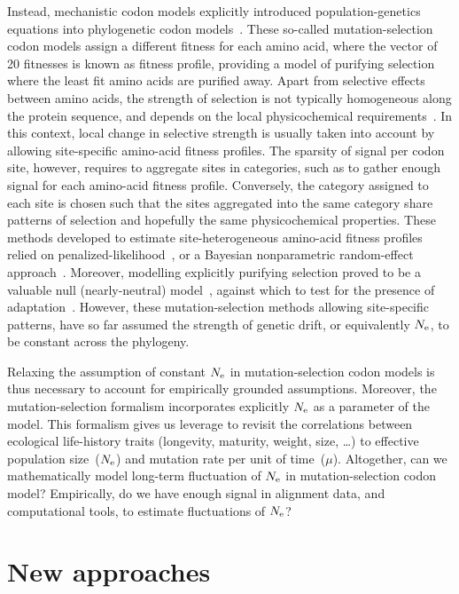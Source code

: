 Instead, mechanistic codon models explicitly introduced population-genetics equations into phylogenetic codon models~\citep{Halpern1998}.
These so-called mutation-selection codon models assign a different fitness for each amino acid, where the vector of 20 fitnesses is known as fitness profile, providing a model of purifying selection where the least fit amino acids are purified away.
Apart from selective effects between amino acids, the strength of selection is not typically homogeneous along the protein sequence, and depends on the local physicochemical requirements~\citep{Echave2016, Goldstein2016,Goldstein2017}.
In this context, local change in selective strength is usually taken into account by allowing site-specific amino-acid fitness profiles.
The sparsity of signal per codon site, however, requires to aggregate sites in categories, such as to gather enough signal for each amino-acid fitness profile.
Conversely, the category assigned to each site is chosen such that the sites aggregated into the same category share patterns of selection and hopefully the same physicochemical properties.
These methods developed to estimate site-heterogeneous amino-acid fitness profiles relied on penalized-likelihood~\citep{Tamuri2012,Tamuri2014}, or a Bayesian nonparametric random-effect approach~\citep{Rodrigue2010,Rodrigue2014,Rodrigue2016}.
Moreover, modelling explicitly purifying selection proved to be a valuable null (nearly-neutral) model~\citep{Spielman2015, DosReis2015}, against which to test for the presence of adaptation~\citep{Rodrigue2016,Bloom2017}.
However, these mutation-selection methods allowing site-specific patterns, have so far assumed the strength of genetic drift, or equivalently $N_{\mathrm{e}}$, to be constant across the phylogeny.

Relaxing the assumption of constant $N_{\mathrm{e}}$ in mutation-selection codon models is thus necessary to account for empirically grounded assumptions.
Moreover, the mutation-selection formalism incorporates explicitly $N_{\mathrm{e}}$ as a parameter of the model.
This formalism gives us leverage to revisit the correlations between ecological life-history traits (longevity, maturity, weight, size, \ldots) to effective population size~($N_{\mathrm{e}}$) and mutation rate per unit of time~($\mu$).
Altogether, can we mathematically model long-term fluctuation of $N_{\mathrm{e}}$ in mutation-selection codon model?
Empirically, do we have enough signal in alignment data, and computational tools, to estimate fluctuations of $N_{\mathrm{e}}$?


\section{New approaches}
\label{sec:NewApproaches}

